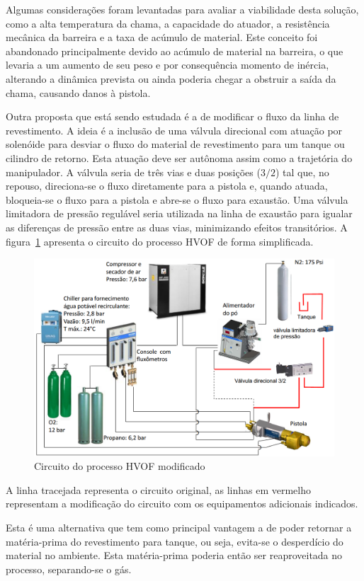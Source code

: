 Algumas considerações foram levantadas para avaliar a viabilidade
desta solução, como a alta temperatura da chama, a capacidade do atuador, a
resistência mecânica da barreira e a taxa de acúmulo de material. Este conceito
foi abandonado principalmente devido ao acúmulo de material na barreira, o que
levaria a um aumento de seu peso e por consequência momento de inércia,
alterando a dinâmica prevista ou ainda poderia chegar a obstruir a saída da
chama, causando danos à pistola.

Outra proposta que está sendo estudada é a de modificar o fluxo da linha de
revestimento. A ideia é a inclusão de uma válvula direcional com atuação por
solenóide para desviar o fluxo do material de revestimento para um tanque ou
cilindro de retorno. Esta atuação deve ser autônoma assim como a
trajetória do manipulador. A válvula seria de três vias e duas posições ($3/2$) tal que, no 
repouso, direciona-se o fluxo diretamente para a pistola e, quando
atuada, bloqueia-se o fluxo para a pistola e abre-se o fluxo para exaustão. Uma
válvula limitadora de pressão regulável seria utilizada na linha de exaustão
para igualar as diferenças de pressão entre as duas vias, minimizando efeitos transitórios.
A figura~\ref{fig::circuito_hvof} apresenta o circuito do processo HVOF de forma
simplificada.

 \begin{figure}[h!]
   \centering
   \includegraphics[width=0.8\columnwidth]{figs/shutter/Circuito_HVOF_mod}
   \caption{Circuito do processo HVOF modificado}
   \label{fig::circuito_hvof}
\end{figure}

A linha tracejada representa o circuito original, as linhas em vermelho
representam a modificação do circuito com os equipamentos adicionais indicados.

Esta é uma alternativa que tem como principal vantagem a de poder retornar a
matéria-prima do revestimento para tanque, ou seja, evita-se
o desperdício do material no ambiente. Esta matéria-prima poderia então ser
reaproveitada no processo, separando-se o gás.
